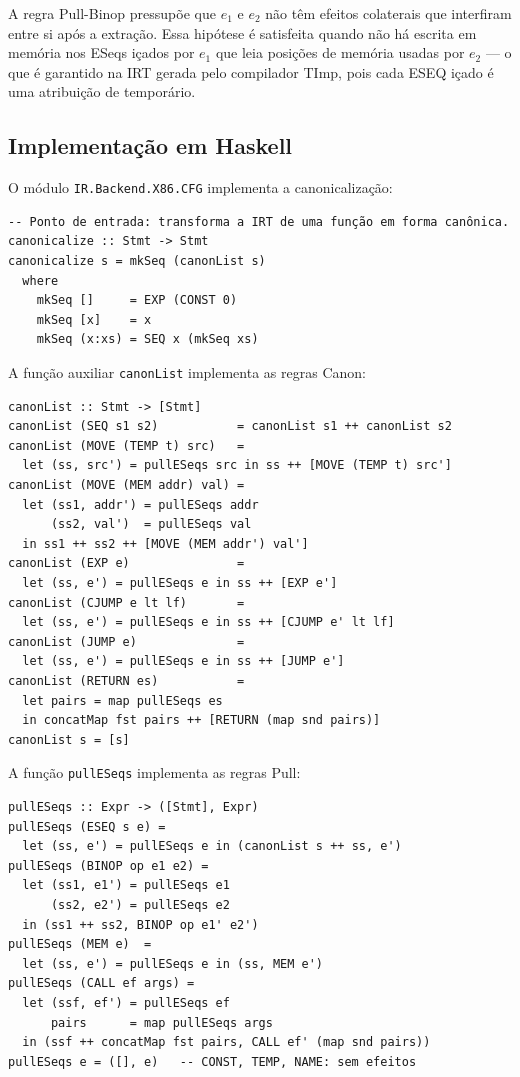 \begin{remark}
  A regra Pull-Binop pressupõe que $e_1$ e $e_2$ não têm efeitos
  colaterais que interfiram entre si após a extração. Essa hipótese é
  satisfeita quando não há escrita em memória nos ESeqs içados por
  $e_1$ que leia posições de memória usadas por $e_2$ — o que é
  garantido na IRT gerada pelo compilador TImp, pois cada ESEQ içado é
  uma atribuição de temporário.
\end{remark}

\subsection{Implementação em Haskell}

O módulo \texttt{IR.Backend.X86.CFG} implementa a canonicalização:

\begin{verbatim}
-- Ponto de entrada: transforma a IRT de uma função em forma canônica.
canonicalize :: Stmt -> Stmt
canonicalize s = mkSeq (canonList s)
  where
    mkSeq []     = EXP (CONST 0)
    mkSeq [x]    = x
    mkSeq (x:xs) = SEQ x (mkSeq xs)
\end{verbatim}

A função auxiliar \texttt{canonList} implementa as regras Canon:

\begin{verbatim}
canonList :: Stmt -> [Stmt]
canonList (SEQ s1 s2)           = canonList s1 ++ canonList s2
canonList (MOVE (TEMP t) src)   =
  let (ss, src') = pullESeqs src in ss ++ [MOVE (TEMP t) src']
canonList (MOVE (MEM addr) val) =
  let (ss1, addr') = pullESeqs addr
      (ss2, val')  = pullESeqs val
  in ss1 ++ ss2 ++ [MOVE (MEM addr') val']
canonList (EXP e)               =
  let (ss, e') = pullESeqs e in ss ++ [EXP e']
canonList (CJUMP e lt lf)       =
  let (ss, e') = pullESeqs e in ss ++ [CJUMP e' lt lf]
canonList (JUMP e)              =
  let (ss, e') = pullESeqs e in ss ++ [JUMP e']
canonList (RETURN es)           =
  let pairs = map pullESeqs es
  in concatMap fst pairs ++ [RETURN (map snd pairs)]
canonList s = [s]
\end{verbatim}

A função \texttt{pullESeqs} implementa as regras Pull:

\begin{verbatim}
pullESeqs :: Expr -> ([Stmt], Expr)
pullESeqs (ESEQ s e) =
  let (ss, e') = pullESeqs e in (canonList s ++ ss, e')
pullESeqs (BINOP op e1 e2) =
  let (ss1, e1') = pullESeqs e1
      (ss2, e2') = pullESeqs e2
  in (ss1 ++ ss2, BINOP op e1' e2')
pullESeqs (MEM e)  =
  let (ss, e') = pullESeqs e in (ss, MEM e')
pullESeqs (CALL ef args) =
  let (ssf, ef') = pullESeqs ef
      pairs      = map pullESeqs args
  in (ssf ++ concatMap fst pairs, CALL ef' (map snd pairs))
pullESeqs e = ([], e)   -- CONST, TEMP, NAME: sem efeitos
\end{verbatim}

